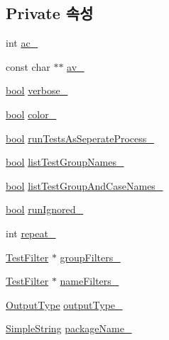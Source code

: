 \subsection*{Private 속성}
\begin{DoxyCompactItemize}
\item 
int \hyperlink{class_command_line_arguments_aadf2e3f0c7f8f9ed6cbd6ee0ca852505}{ac\+\_\+}
\item 
const char $\ast$$\ast$ \hyperlink{class_command_line_arguments_aa1ce1557f3b793de10259ccce00a493f}{av\+\_\+}
\item 
\hyperlink{avb__gptp_8h_af6a258d8f3ee5206d682d799316314b1}{bool} \hyperlink{class_command_line_arguments_a86126da532c138842a42d8e9a52b0806}{verbose\+\_\+}
\item 
\hyperlink{avb__gptp_8h_af6a258d8f3ee5206d682d799316314b1}{bool} \hyperlink{class_command_line_arguments_adda8c1875964c3b80ed1c77b585fc756}{color\+\_\+}
\item 
\hyperlink{avb__gptp_8h_af6a258d8f3ee5206d682d799316314b1}{bool} \hyperlink{class_command_line_arguments_a5c5869542e7f90a7ece33a6962c8bf88}{run\+Tests\+As\+Seperate\+Process\+\_\+}
\item 
\hyperlink{avb__gptp_8h_af6a258d8f3ee5206d682d799316314b1}{bool} \hyperlink{class_command_line_arguments_a8c47b9aa44aaf4cde0bf295b79fdc2e6}{list\+Test\+Group\+Names\+\_\+}
\item 
\hyperlink{avb__gptp_8h_af6a258d8f3ee5206d682d799316314b1}{bool} \hyperlink{class_command_line_arguments_a934f3f89397df077d15580125b18ccce}{list\+Test\+Group\+And\+Case\+Names\+\_\+}
\item 
\hyperlink{avb__gptp_8h_af6a258d8f3ee5206d682d799316314b1}{bool} \hyperlink{class_command_line_arguments_a9aedd4f11eb25d8bd013c2463fccfea6}{run\+Ignored\+\_\+}
\item 
int \hyperlink{class_command_line_arguments_ae817df6683a04a17ebb450687325eb8d}{repeat\+\_\+}
\item 
\hyperlink{class_test_filter}{Test\+Filter} $\ast$ \hyperlink{class_command_line_arguments_a0efdcaf4d54223caffe82738f5db8061}{group\+Filters\+\_\+}
\item 
\hyperlink{class_test_filter}{Test\+Filter} $\ast$ \hyperlink{class_command_line_arguments_ad2305aa697f8aab0ff0cbe9de842da56}{name\+Filters\+\_\+}
\item 
\hyperlink{class_command_line_arguments_a4e0517338e6c4a31a2addafc06d4f3a3}{Output\+Type} \hyperlink{class_command_line_arguments_abc5e0c7954aafcf27c9603b01f608faf}{output\+Type\+\_\+}
\item 
\hyperlink{class_simple_string}{Simple\+String} \hyperlink{class_command_line_arguments_ab4f0e1fe33d9e9ee52d8333ca3a966f3}{package\+Name\+\_\+}
\end{DoxyCompactItemize}


